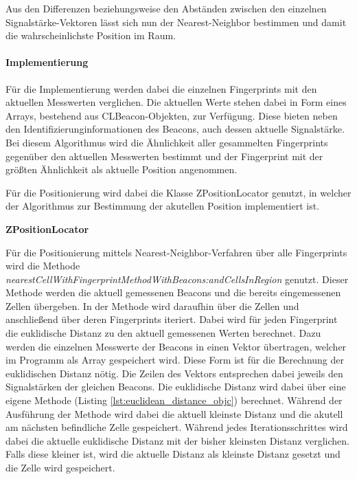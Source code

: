 Aus den Differenzen beziehungsweise den Abständen zwischen den einzelnen Signalstärke-Vektoren lässt sich nun der Nearest-Neighbor bestimmen und damit die wahrscheinlichste Position im Raum.

\paragraph{Implementierung}
\label{sec:}
Für die Implementierung werden dabei die einzelnen Fingerprints mit den aktuellen Messwerten verglichen.
Die aktuellen Werte stehen dabei in Form eines Arrays, bestehend aus CLBeacon-Objekten, zur Verfügung. Diese bieten neben den Identifizierunginformationen des Beacons, auch dessen aktuelle Signalstärke.
Bei diesem Algorithmus wird die Ähnlichkeit aller gesammelten Fingerprints gegenüber den aktuellen Messwerten bestimmt und der Fingerprint mit der größten Ähnlichkeit als aktuelle Position angenommen.

Für die Positionierung wird dabei die Klasse ZPositionLocator genutzt, in welcher der Algorithmus zur Bestimmung der akutellen Position implementiert ist.

\textbf{ZPositionLocator}

Für die Positionierung mittels Nearest-Neighbor-Verfahren über alle Fingerprints wird die Methode \emph{nearestCellWithFingerprintMethodWithBeacons:andCellsInRegion} genutzt.
Dieser Methode werden die aktuell gemessenen Beacons und die bereits eingemessenen Zellen übergeben. 
In der Methode wird daraufhin über die Zellen und anschließend über deren Fingerprints iteriert. Dabei wird für jeden Fingerprint die euklidische Distanz zu den aktuell gemessenen Werten berechnet. Dazu werden die einzelnen Messwerte der Beacons in einen Vektor übertragen, welcher im Programm als Array gespeichert wird. Diese Form ist für die Berechnung der euklidischen Distanz nötig. 
Die Zeilen des Vektors entsprechen dabei jeweils den Signalstärken der gleichen Beacons. 
Die euklidische Distanz wird dabei über eine eigene Methode (Listing \ref{lst:euclidean_distance_objc}) berechnet.
Während der Ausführung der Methode wird dabei die aktuell kleinste Distanz und die akutell am nächsten befindliche Zelle gespeichert.
Während jedes Iterationsschrittes wird dabei die aktuelle euklidische Distanz mit der bisher kleinsten Distanz verglichen. Falls diese kleiner ist, wird die aktuelle Distanz als kleinste Distanz gesetzt und die Zelle wird gespeichert.


